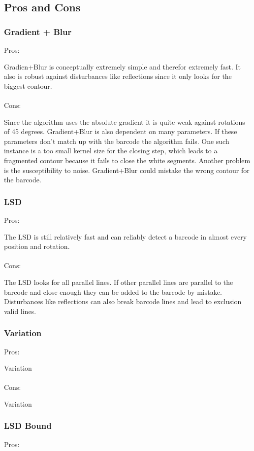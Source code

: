 \subsection{Pros and Cons}
\subsubsection*{Gradient + Blur}
Pros:

Gradien+Blur is conceptually extremely simple and therefor extremely fast. It also is robust against disturbances like reflections since it only looks for the biggest contour.
\\
\\
Cons:

Since the algorithm uses the absolute gradient it is quite weak against rotations of 45 degrees. Gradient+Blur is also dependent on many parameters. If these parameters don't match up with the barcode the algorithm fails. One such instance is a too small kernel size for the closing step, which leads to a fragmented contour because it fails to close the white segments. Another problem is the susceptibility to noise. Gradient+Blur could mistake the wrong contour for the barcode.

\subsubsection*{LSD}
Pros:

The LSD is still relatively fast and can reliably detect a barcode in almost every position and rotation.
\\
\\
Cons:

The LSD looks for all parallel lines. If other parallel lines are parallel to the barcode and close enough they can be added to the barcode by mistake. Disturbances like reflections can also break barcode lines and lead to exclusion valid lines.

\subsubsection*{Variation}
Pros:

Variation
\\
\\
Cons:

Variation

\subsubsection*{LSD Bound}
Pros:

